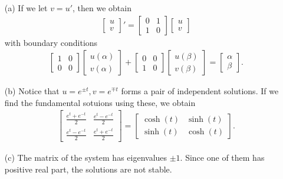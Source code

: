 \documentclass[10pt]{article}
\begin{document}
\begin{itemize}

\item[(a)] If we let $ v = u' $, then we obtain \begin{align*}
\begin{bmatrix}
u \\
v
\end{bmatrix} ' = \begin{bmatrix}
0 & 1 \\
1 & 0
\end{bmatrix} \begin{bmatrix}
u \\
v
\end{bmatrix}
\end{align*} with boundary conditions \begin{align*}
\begin{bmatrix}
1 & 0 \\
0 & 0
\end{bmatrix} \begin{bmatrix}
u(\alpha) \\
v(\alpha)
\end{bmatrix} + \begin{bmatrix}
0 & 0 \\
1 & 0
\end{bmatrix} \begin{bmatrix}
u(\beta) \\
v(\beta)
\end{bmatrix} = \begin{bmatrix}
\alpha \\
\beta
\end{bmatrix}.
\end{align*} 

\item[(b)] Notice that $ u = e^{\pm t}, v = e^{\mp t} $ forms a pair of independent solutions. If we find the fundamental sotuions using these, we obtain \begin{align*}
\begin{bmatrix}
\frac{e^t + e^{-t}}{2} & \frac{e^t - e^{-t}}{2} \\
\frac{e^t - e^{-t}}{2} & \frac{e^t + e^{-t}}{2}
\end{bmatrix} = \begin{bmatrix}
\cosh(t) & \sinh(t) \\
\sinh(t) & \cosh(t)
\end{bmatrix}.
\end{align*}

\item[(c)] The matrix of the system has eigenvalues $ \pm 1$. Since one of them has positive real part, the solutions are not stable.


\end{itemize}
\end{document}

